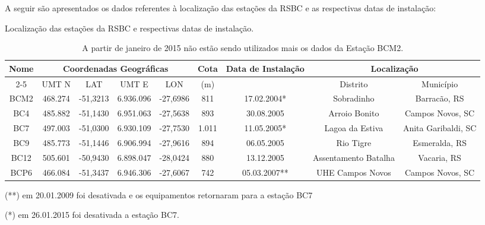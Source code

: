 A seguir são apresentados os dados referentes à localização das estações da RSBC e as respectivas datas de instalação:

\begin{table}[ht!]
\begin{tiny}
\centering
    \captionsetup{justification=justified,singlelinecheck=false}
    \caption{Localização das estações da RSBC e respectivas datas de instalação.}
    \begin{tabular}{|c|c|c|c|c|c|c|c|c|}
        \hline
        \multirow{2}{*}{Nome}
            & \multicolumn{4}{c|}{Coordenadas Geográficas}
            & \multirow{2}{*}{Cota} & \multirow{2}{*}{Data de Instalação} 
            & \multicolumn{2}{c|}{Localização} \\
            \cline{2-5}
            \cline{8-9}
            & UMT N  &  LAT & UMT E & LON & (m) && Distrito & Município \\
        \hline
        BCM2 & 468.274 & -51,3213 & 6.936.096 & -27,6986 & 811 & 17.02.2004* & Sobradinho & Barracão, RS\\
        \hline
        BC4 & 485.882 & -51,1430 & 6.951.063 & -27,5638 & 893 & 30.08.2005 & Arroio Bonito & Campos Novos, SC \\
        \hline
        BC7 & 497.003 & -51,0300 & 6.930.109 & -27,7530 & 1.011 & 11.05.2005* & Lagoa da Estiva & Anita Garibaldi, SC \\
        \hline
        BC9 & 485.773 & -51,1446 & 6.906.994 & -27,9616 & 894 & 06.05.2005 & Rio Tigre & Esmeralda, RS \\
        \hline
        BC12 & 505.601 & -50,9430 & 6.898.047 & -28,0424 & 880 & 13.12.2005 & Assentamento Batalha & Vacaria, RS \\
        \hline
        BCP6 & 466.084 & -51,3437 & 6.946.306 & -27,6067 & 742 & 05.03.2007** & UHE Campos Novos & Campos Novos, SC \\
        \hline
    \end{tabular}
    \caption*{(**) em 20.01.2009 foi desativada e os equipamentos retornaram para a estação BC7}
    \caption*{(*) em 26.01.2015 foi desativada a estação BC7.}
    \caption*{A partir de janeiro de 2015 não estão sendo utilizados mais os dados da Estação BCM2.}
\end{tiny}
\end{table}

